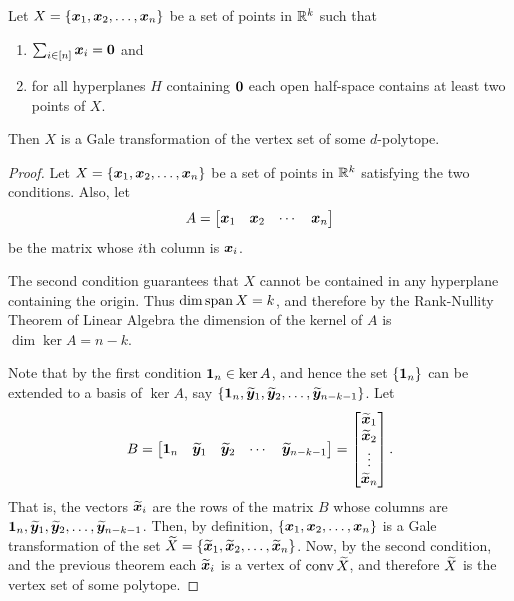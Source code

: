 \begin{Theorem}\label{Thm:GaleTransOIf}
    Let \(X=\left\{\bm{x}_1, \bm{x}_2,\dotsc,\bm{x}_n\right\}\) be a set of points in \(\mathbb{R}^{k}\) such that
        \begin{enumerate}
            \item   \(\sum_{i\in\left[n\right]}{\bm{x}}_i=\bm{0}\) and
            \item   for all hyperplanes \(H\) containing \(\bm{0}\) each open half-space contains at least two points of \(X\).
        \end{enumerate}
    Then \(X\) is a Gale transformation of the vertex set of some \(d\)-polytope.
\end{Theorem}
\begin{proof}
    Let \(X=\left\{\bm{x}_1, \bm{x}_2,\dotsc,\bm{x}_n\right\}\) be a set of points in \(\mathbb{R}^{k}\) satisfying the two conditions.  Also, let
        \[
            A
                =
                \begin{bmatrix}
                    \bm{x}_1 &\bm{x}_2 &\cdots &\bm{x}_n
                \end{bmatrix}
        \]
    be the matrix whose \(i\)th column is \(\bm{x}_i\).

    The second condition guarantees that \(X\) cannot be contained in any hyperplane containing the origin.  Thus \(\dim\operatorname{span} X=k\), and therefore by the Rank-Nullity Theorem of Linear Algebra the dimension of the kernel of \(A\) is \(\dim\ker A=n-k\).

    Note that by the first condition \(\bm{1}_n\in\ker A\), and hence the set \(\left\{\bm{1}_n\right\}\) can be extended to a basis of \(\ker A\), say \(\left\{\bm{1}_n, \widetilde{\bm{y}}_1,\widetilde{\bm{y}}_2,\dotsc,\widetilde{\bm{y}}_{n-k-1}\right\}\).  Let
        \[
            B
                =
                \begin{bmatrix}
                    \bm{1}_n &\widetilde{\bm{y}}_1 &\widetilde{\bm{y}}_2 &\cdots &\widetilde{\bm{y}}_{n-k-1}
                \end{bmatrix}
                =
                \begin{bmatrix}
                    \widetilde{\bm{x}}_1\\ \widetilde{\bm{x}}_2\\ \vdots\\ \widetilde{\bm{x}}_n
                \end{bmatrix}.
        \]
    That is, the vectors \(\widetilde{\bm{x}}_i\) are the rows of the matrix \(B\) whose columns are \(\bm{1}_n,\widetilde{\bm{y}}_1,\widetilde{\bm{y}}_2,\dotsc,\widetilde{\bm{y}}_{n-k-1}\).  Then, by definition, \(\left\{\bm{x}_1, \bm{x}_2,\dotsc,\bm{x}_n\right\}\) is a Gale transformation of the set \(\widetilde{X}=\left\{\widetilde{\bm{x}}_1,\widetilde{\bm{x}}_2,\dotsc,\widetilde{\bm{x}}_n\right\}\).  Now, by the second condition, and the previous theorem each \(\widetilde{\bm{x}}_i\) is a vertex of \(\operatorname{conv}\widetilde{X}\), and therefore \(\widetilde{X}\) is the vertex set of some polytope.
\end{proof}

